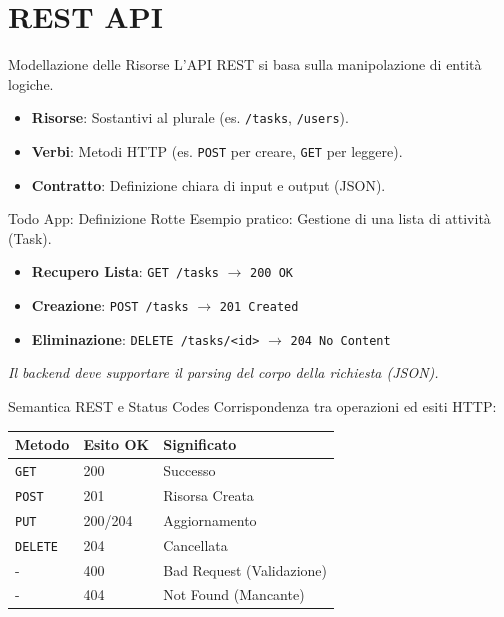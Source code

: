 \documentclass[10pt]{beamer}
\begin{document}
\section{REST API}
\begin{frame}{Modellazione delle Risorse}
    L'API REST si basa sulla manipolazione di entità logiche.
    \begin{itemize}
        \item \textbf{Risorse}: Sostantivi al plurale (es. \texttt{/tasks}, \texttt{/users}).
        \item \textbf{Verbi}: Metodi HTTP (es. \texttt{POST} per creare, \texttt{GET} per leggere).
        \item \textbf{Contratto}: Definizione chiara di input e output (JSON).
    \end{itemize}
\end{frame}

\begin{frame}{Todo App: Definizione Rotte}
    Esempio pratico: Gestione di una lista di attività (Task).
    \begin{itemize}
        \item \textbf{Recupero Lista}: \texttt{GET /tasks} $\rightarrow$ \texttt{200 OK}
        \item \textbf{Creazione}: \texttt{POST /tasks} $\rightarrow$ \texttt{201 Created}
        \item \textbf{Eliminazione}: \texttt{DELETE /tasks/<id>} $\rightarrow$ \texttt{204 No Content}
    \end{itemize}
    \vspace{0.3cm}
    \textit{Il backend deve supportare il parsing del corpo della richiesta (JSON).}
\end{frame}

\begin{frame}{Semantica REST e Status Codes}
    Corrispondenza tra operazioni ed esiti HTTP:
    \vspace{0.2cm}
    \centering
    \begin{tabular}{lll}
        \toprule
        \textbf{Metodo} & \textbf{Esito OK} & \textbf{Significato} \\
        \midrule
        \texttt{GET} & 200 & Successo \\
        \texttt{POST} & 201 & Risorsa Creata \\
        \texttt{PUT} & 200/204 & Aggiornamento \\
        \texttt{DELETE} & 204 & Cancellata \\
        - & 400 & Bad Request (Validazione) \\
        - & 404 & Not Found (Mancante) \\
        \bottomrule
    \end{tabular}
\end{frame}
\end{document}
